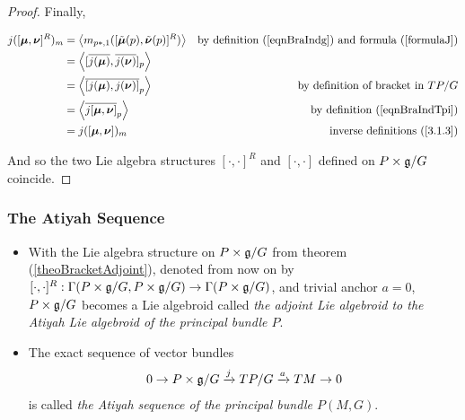 \begin{proof}
Finally,

\begin{align*}
    j([\bm{\mu}, \bm{\nu}]^R)_m 
    &= \left\langle m_{p*, 1} ([\Tilde{\bm{\mu}}(p), \Tilde{\bm{\nu}}(p)]^R) \right\rangle & \textrm{by definition (\ref{eqnBraIndg}) and formula (\ref{formulaJ})} \\ 
    &= \left\langle [\overline{j(\bm{\mu})}, \overline{j(\bm{\nu})}]_p \right\rangle\\
    &= \left\langle \overline{[j(\bm{\mu}), j(\bm{\nu})]}_p \right\rangle & \textrm{by definition of bracket in $TP/G$}\\
    &= \left\langle \overline{j[\bm{\mu}, \bm{\nu}]}_p \right\rangle & \textrm{by definition (\ref{eqnBraIndTpi})} \\
    &= j([\bm{\mu}, \bm{\nu}])_m & \textrm{inverse definitions (\ref{3.1.3})}
\end{align*}

And so the two Lie algebra structures $[\cdot, \cdot]^R$ and $[\cdot, \cdot]$ defined on $P \times \mathfrak{g}/G$ coincide.

\end{proof}

\subsubsection{The Atiyah Sequence}
\begin{definition}\label{AtiyahSeq}
    \begin{itemize}
    
    \item With the Lie algebra structure on $P \times \mathfrak{g}/G$ from theorem (\ref{theoBracketAdjoint}), denoted from now on by $[\cdot, \cdot]^R: \Gamma(P \times \mathfrak{g}/G, P \times \mathfrak{g}/G) \to \Gamma(P \times \mathfrak{g}/G)$, and trivial anchor $a=0$, $P \times \mathfrak{g}/G$ becomes a Lie algebroid called \emph{the adjoint Lie algebroid to the Atiyah Lie algebroid of the principal bundle $P$}.
    
    \item The exact sequence of vector bundles
\begin{align} \label{AtiyahSequence}
    0 \to P \times \mathfrak{g}/G \xrightarrow{j} TP/G \xrightarrow{a} TM \to 0
\end{align}
is called \emph{the Atiyah sequence of the principal bundle $P(M, G)$}.
    
    \end{itemize}


\end{definition}


